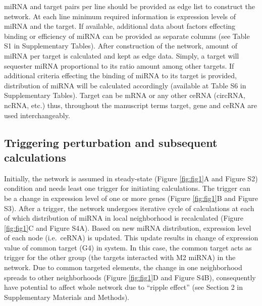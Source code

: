 \documentclass[a4,center,fleqn]{NAR}
\begin{document}
miRNA and target pairs per line should be provided as edge list to
construct the network. At each line minimum required information is
expression levels of miRNA and the target. If available, additional data
about factors effecting binding or efficiency of miRNA can be provided
as separate columns (see Table S1 in Supplementary Tables). After
construction of the network, amount of miRNA per target is calculated
and kept as edge data. Simply, a target will sequester miRNA
proportional to its ratio amount among other targets. If additional
criteria effecting the binding of miRNA to its target is provided,
distribution of miRNA will be calculated accordingly (available at Table
S6 in Supplementary Tables). Target can be mRNA or any other ceRNA
(circRNA, ncRNA, etc.) thus, throughout the manuscript terms target,
gene and ceRNA are used interchangeably.

\subsection{Triggering perturbation and subsequent calculations}

Initially, the network is assumed in steady-state (Figure
\ref{fig:fig1}A and Figure S2) condition and needs least one trigger for
initiating calculations. The trigger can be a change in expression level
of one or more genes (Figure \ref{fig:fig1}B and Figure S3). After a
trigger, the network undergoes iterative cycle of calculations at each
of which distribution of miRNA in local neighborhood is recalculated
(Figure \ref{fig:fig1}C and Figure S4A). Based on new miRNA
distribution, expression level of each node (i.e.~ceRNA) is updated.
This update results in change of expression value of common target (G4)
in system. In this case, the common target acts as trigger for the other
group (the targets interacted with M2 miRNA) in the network. Due to
common targeted elements, the change in one neighborhood spreads to
other neighborhoods (Figure \ref{fig:fig1}D and Figure S4B),
consequently have potential to affect whole network due to ``ripple
effect'' (see Section 2 in Supplementary Materials and Methods).
\end{document}
